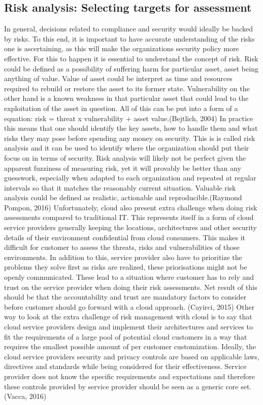 \documentclass{article}
\begin{document}
\subsection{Risk analysis: Selecting targets for assessment}
In general, decisions related to compliance and security would ideally be backed by risks. To this end, it is important to have accurate understanding of the risks one is ascertaining, as this will make the organizations security policy more effective.
For this to happen it is essential to understand the concept of risk. Risk could be defined as a possibility of suffering harm for particular asset, asset being anything of value. Value of asset could be interpret as time and resources required to rebuild or restore the asset to its former state. Vulnerability on the other hand is a known weakness in that particular asset that could lead to the exploitation of the asset in question. All of this can be put into a form of a equation: risk = threat x vulnerability + asset value.(Bejtlich, 2004)
In practice this means that one should identify the key assets, how to handle them and what risks they may pose before spending any money on security. This is is called risk analysis and it can be used to identify where the organization should put their focus on in terms of security. Risk analysis will likely not be perfect given the apparent fuzziness of measuring risk, yet it will provably be better than any guesswork, especially when adapted to each organization and repeated at regular intervals so that it matches the reasonably current situation. Valuable risk analysis could be defined as realistic, actionable and reproducible.(Raymond Pompon, 2016)
Unfortunately, cloud also present extra challenge when doing risk assessments compared to traditional IT. This represents itself in a form of cloud service providers generally keeping the locations, architectures and other security details of their environment confidential from cloud consumers. This makes it difficult for customer to assess the threats, risks and vulnerabilities of those environments. In addition to this, service provider also have to prioritize the problems they solve first as risks are realized, these priorisations might not be openly communicated. These lead to a situation where customer has to rely and trust on the service provider when doing their risk assessments. Net result of this should be that the accountability and trust are mandatory factors to consider before customer should go forward with a cloud approach. (Cayirci, 2015)
Other way to look at the extra challenge of risk management with cloud is to say that cloud service providers design and implement their architectures and services to fit the requirements of a large pool of potential cloud customers in a way that requires the smallest possible amount of per customer customization. Ideally, the cloud service providers security and privacy controls are based on applicable laws, directives and standards while being considered for their effectiveness. Service provider does not know the specific requirements and expectations and therefore these controls provided by service provider should be seen as a generic core set. (Vacca, 2016)
\end{document}
